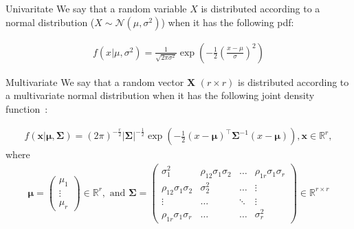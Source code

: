\documentclass[10pt]{beamer}
\numberwithin{equation}{section}
\begin{document}
    \begin{frame}{Univaritate}
        We say that a random variable $X$ is distributed
        according to a normal distribution ($X \sim \mathcal{N}(\mu, \sigma^2)$) when it has the following pdf:

        \begin{definition}
            \begin{align}
                \label{eq:pdf_normal_dist}
                f(x|\mu, \sigma^2) = \frac{1}{\sqrt{2\pi\sigma^2}}
                \exp{\left(-\frac{1}{2}\left(\frac{x-\mu}{\sigma}\right)^2\right)}
            \end{align}
        \end{definition}
    \end{frame}

    \begin{frame}{Multivariate}
        We say that a random vector $\bm{X}$ $(r \times r)$
        is distributed according to a multivariate normal distribution
        when it has the following joint density function~\autocite[p. 59]{izenman_modern_2008}:

        \begin{definition}
            \begin{align}
                f(\bm{x}| \bm{\mu}, \bm{\Sigma})
                = (2\pi)^{-\frac{r}{2}}
                \left|\bm{\Sigma}\right|^{-\frac{1}{2}}
                \exp\left(-\frac{1}{2}(x-\bm{\mu})^\top \bm{\Sigma}^{-1} (x-\bm{\mu})\right),
                \bm{x} \in \mathbb{R}^r,
            \end{align}
            where
            \begin{align}
                \bm{\mu} =
                \begin{pmatrix}
                    \mu_1  \\
                    \vdots \\
                    \mu_r
                \end{pmatrix}
                \in \mathbb{R}^r,
                \text{ and }
                \bm{\Sigma} =
                \begin{pmatrix}
                    \sigma_1^2                & \rho_{12}\sigma_1\sigma_2 & \ldots & \rho_{1r}\sigma_1\sigma_r \\
                    \rho_{12}\sigma_1\sigma_2 & \sigma_2^2                & \ldots & \vdots                    \\
                    \vdots                    & \ldots                    & \ddots & \vdots                    \\
                    \rho_{1r}\sigma_1\sigma_r & \ldots                    & \ldots & \sigma_r^2
                \end{pmatrix}
                \in \mathbb{R}^{r\times r}
            \end{align}
        \end{definition}
    \end{frame}
\end{document}
